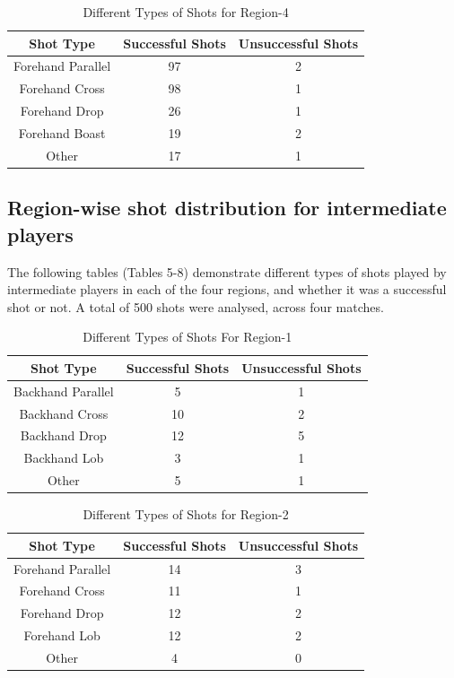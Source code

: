 \documentclass[10pt,conference]{IEEEtran}
\begin{document}
\begin{table}[h!]
\centering
\begin{tabular}{||c c c||} 
 \hline
 Shot Type & Successful Shots & Unsuccessful Shots \\ [0.5ex]
 \hline\hline
 Forehand Parallel & 97 & 2  \\ 
 Forehand Cross & 98 & 1  \\
 Forehand Drop & 26 & 1  \\
 Forehand Boast & 19 & 2  \\
 Other & 17 & 1  \\ [1ex] 
 \hline
\end{tabular}
\caption{Different Types of Shots for Region-4}
\label{table:2}
\end{table}

\subsection{Region-wise shot distribution for intermediate players}
The following tables (Tables 5-8) demonstrate different types of shots played by intermediate players in each of the four regions, and whether it was a successful shot or not.  A total of 500 shots were analysed, across four matches.
\begin{table}[h!]
\centering
\begin{tabular}{||c c c||} 
 \hline
 Shot Type & Successful Shots & Unsuccessful Shots \\ [0.5ex]
 \hline\hline
 Backhand Parallel & 5 & 1  \\ 
 Backhand Cross & 10 & 2  \\
 Backhand Drop & 12 & 5  \\
 Backhand Lob & 3 & 1  \\
 Other & 5 & 1  \\ [1ex] 
 \hline
\end{tabular}
\caption{Different Types of Shots For Region-1}
\label{table:1}
\end{table}

\begin{table}[h!]
\centering
\begin{tabular}{||c c c||}
 \hline
 Shot Type & Successful Shots & Unsuccessful Shots \\ [0.5ex]
 \hline\hline
 Forehand Parallel & 14 & 3  \\ 
 Forehand Cross & 11 & 1  \\
 Forehand Drop & 12 & 2  \\
 Forehand Lob & 12 & 2  \\
 Other & 4 & 0  \\ [1ex] 
 \hline
\end{tabular}
\caption{Different Types of Shots for Region-2}

\end{table}
\end{document}
